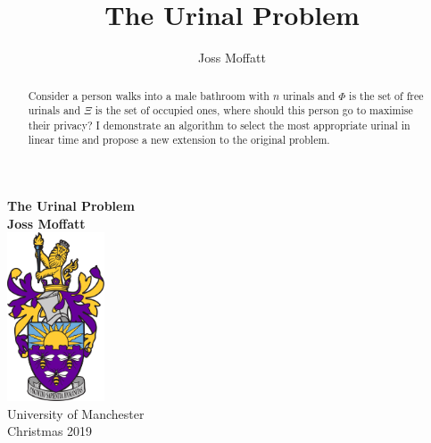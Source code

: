 \documentclass{article}
\author{Joss Moffatt}
\title{The Urinal Problem}
\begin{document}
\begin{titlepage}
  \begin{center}
    \huge
    \textbf{The Urinal Problem}\\
    \vspace{1cm}
    \textbf{Joss Moffatt}\\
    \large
    \vspace{1cm}
    \includegraphics[height=50mm]{University-Logo/UOM.png}\\ %
    \vspace{1cm}
    University of Manchester\\
    Christmas 2019
    \vspace{1cm}
    \begin{abstract}
      Consider a person walks into a male bathroom with $n$ urinals and $\Phi$ is the set of free urinals and $\Xi$ is the set of occupied ones, where should this person go to maximise their privacy? I demonstrate an algorithm to select the most appropriate urinal in linear time and propose a new extension to the original problem.  
    \end{abstract}
   \end{center}
\end{titlepage}
\maketitle
\tableofcontents

\pagebreak
\vspace{1cm}
\cfoot{\thepage}
\end{document}

